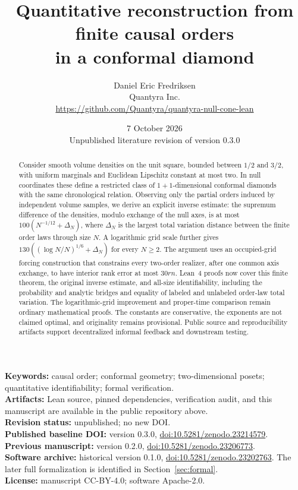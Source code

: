\documentclass[11pt]{article}
\title{Quantitative reconstruction from finite causal orders\\in a conformal diamond}
\author{Daniel Eric Fredriksen\\Quantyra Inc.\\\url{https://github.com/Quantyra/quantyra-null-cone-lean}}
\date{7 October 2026 \\ Unpublished literature revision of version 0.3.0}
\theoremstyle{remark}
\begin{document}
\maketitle
\begin{abstract}
Consider smooth volume densities on the unit square, bounded between
$1/2$ and $3/2$, with uniform marginals and Euclidean Lipschitz constant at
most two. In null coordinates these define a restricted class of
$1+1$-dimensional conformal diamonds with the same chronological relation.
Observing only the partial orders induced by independent volume samples,
we derive an explicit inverse estimate: the supremum difference of the
densities, modulo exchange of the null axes, is at most
$100(N^{-1/12}+\Delta_N)$, where $\Delta_N$ is the largest total variation
distance between the finite order laws through size $N$. A logarithmic
grid scale further gives $130((\log N/N)^{1/6}+\Delta_N)$ for every
$N\ge2$. The argument
uses an occupied-grid forcing construction that constrains every
two-order realizer, after one common axis exchange, to have interior
rank error at most $30rn$. Lean~4 proofs now cover this finite theorem,
the original inverse estimate, and all-size identifiability, including
the probability and analytic bridges and equality of labeled and
unlabeled order-law total variation. The logarithmic-grid improvement
and proper-time comparison remain ordinary mathematical proofs.
The constants are conservative, the exponents are not claimed optimal,
and originality remains provisional. Public source and reproducibility
artifacts support decentralized informal feedback and downstream testing.
\end{abstract}

\noindent\textbf{Keywords:} causal order; conformal geometry; two-dimensional
posets; quantitative identifiability; formal verification.\\
\textbf{Artifacts:} Lean source, pinned dependencies, verification audit,
and this manuscript are available in the public repository above.\\
\textbf{Revision status:} unpublished; no new DOI.\\
\textbf{Published baseline DOI:} version 0.3.0,
\href{https://doi.org/10.5281/zenodo.23214579}{doi:10.5281/zenodo.23214579}.\\
\textbf{Previous manuscript:} version 0.2.0,
\href{https://doi.org/10.5281/zenodo.23206773}{doi:10.5281/zenodo.23206773}.\\
\textbf{Software archive:} historical version 0.1.0,
\href{https://doi.org/10.5281/zenodo.23202763}{doi:10.5281/zenodo.23202763}.
The later full formalization is identified in Section~\ref{sec:formal}.\\
\textbf{License:} manuscript CC-BY-4.0; software Apache-2.0.
\end{document}
